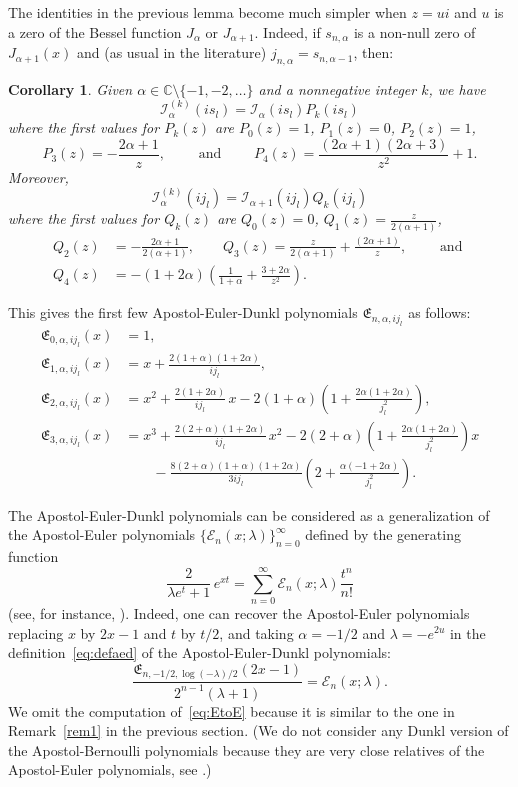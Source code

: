 \documentclass[10pt,a4paper]{article}
\theoremstyle{plain}
\newtheorem{corollary}[theorem]{Corollary}
\theoremstyle{definition}
\numberwithin{equation}{section} %
\newcommand{\I}{\mathcal{I}}
\newcommand{\E}{\mathfrak{E}}
\newcommand{\CC}{\mathbb{C}}
\begin{document}
The identities in the previous lemma become much simpler when $z = ui$ and $u$ is a zero of the Bessel function $J_\alpha$ or $J_{\alpha+1}$. Indeed,
if $s_{n,\alpha}$ is a non-null zero of $J_{\alpha+1}(x)$ and (as usual in the literature) $j_{n,\alpha}=s_{n,\alpha-1}$, then:

\begin{corollary}
\label{cor:cmn}
Given $\alpha\in\CC \setminus \{-1,-2,\dots \}$ and a nonnegative integer $k$, we have
\[
  \I_\alpha^{(k)}(is_l) = \I_\alpha(is_l) P_k(is_l)
\]
where the first values for $P_k(z)$  are
$P_0(z)=1$, $P_1(z)=0$, $P_2(z)=1$,
\[
  P_3(z) = -\frac{2\alpha+1}{z},
  \qquad \text{ and }
  \qquad P_4(z) = \frac{(2\alpha+1)(2\alpha+3)}{z^2}+1.
\]
Moreover,
\[
  \I_\alpha^{(k)}(ij_l) = \I_{\alpha+1}(ij_l) Q_k(ij_l)
\]
where the first values for  $Q_k(z)$ are
$Q_0(z)=0$, $\displaystyle Q_1(z)=\frac{z}{2(\alpha+1)}$,
\begin{align*}
  Q_2(z) &= -\frac{2\alpha+1}{2(\alpha+1)},
  \qquad Q_3(z) = \frac{z}{2(\alpha+1)}+\frac{(2\alpha+1)}{z},
  \qquad \text{ and }\\
  Q_4(z) &= -(1+2\alpha)\left(\frac{1}{1+\alpha}+\frac{3+2\alpha}{z^2}\right).
\end{align*}
\end{corollary}

This gives the first few Apostol-Euler-Dunkl polynomials $\E_{n,\alpha,ij_l}$ as follows:
\begin{align*}
  \E_{0,\alpha,ij_l}(x) &= 1, \\
  \E_{1,\alpha,ij_l}(x) &= x + \frac{2(1+\alpha)(1+2\alpha)}{ij_l}, \\
  \E_{2,\alpha,ij_l}(x) &= x^2 + \frac{2(1+2\alpha)}{i j_l} \, x
    - 2(1+\alpha)\left(1+\frac{2\alpha(1+2\alpha)}{j_l^2}\right), \\
  \E_{3,\alpha,ij_l}(x) &= x^3 + \frac{2(2+\alpha)(1+2\alpha)}{i j_l} \,x^2
    - 2(2+\alpha)\left(1+\frac{2\alpha(1+2\alpha)}{j_l^2}\right) x \\
  &\qquad - \frac{8(2+\alpha)(1+\alpha)(1+2\alpha)}{3ij_l}
    \left(2+\frac{\alpha(-1+2\alpha)}{j_l^2}\right).
\end{align*}

The Apostol-Euler-Dunkl polynomials can be considered as a generalization of the Apostol-Euler
polynomials $\{\mathcal{E}_n(x;\lambda)\}_{n=0}^\infty$ defined by the generating function
\[
\frac{2}{\lambda e^t+1}\,e^{xt}
= \sum_{n=0}^\infty \mathcal{E}_n(x;\lambda) \frac{t^n}{n!}
\]
(see, for instance, \cite{NRV}). Indeed, one can recover the Apostol-Euler polynomials replacing $x$ by $2x-1$ and $t$ by $t/2$, and taking $\alpha=-1/2$ and $\lambda=-e^{2u}$ in the definition~\eqref{eq:defaed} of the Apostol-Euler-Dunkl polynomials:
\begin{equation}
\label{eq:EtoE}
  \frac{\E_{n,-1/2,\log(-\lambda)/2}(2x-1)}{2^{n-1}(\lambda+1)} = \mathcal{E}_n(x;\lambda).
\end{equation}
We omit the computation of~\eqref{eq:EtoE} because it is similar to the one in Remark~\ref{rem1} in the previous section.
(We do not consider any Dunkl version of the Apostol-Bernoulli polynomials \cite{Ap} because they are very close relatives of the Apostol-Euler polynomials, see \cite[Lemma~2]{NRV}.)
\end{document}
